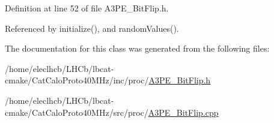 Definition at line 52 of file A3\+P\+E\+\_\+\+Bit\+Flip.\+h.



Referenced by initialize(), and random\+Values().



The documentation for this class was generated from the following files\+:\begin{DoxyCompactItemize}
\item 
/home/eleclhcb/\+L\+H\+Cb/lbcat-\/cmake/\+Cat\+Calo\+Proto40\+M\+Hz/inc/proc/\hyperlink{A3PE__BitFlip_8h}{A3\+P\+E\+\_\+\+Bit\+Flip.\+h}\item 
/home/eleclhcb/\+L\+H\+Cb/lbcat-\/cmake/\+Cat\+Calo\+Proto40\+M\+Hz/src/proc/\hyperlink{A3PE__BitFlip_8cpp}{A3\+P\+E\+\_\+\+Bit\+Flip.\+cpp}\end{DoxyCompactItemize}
